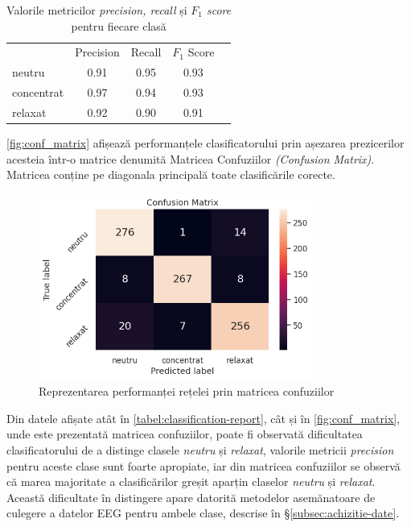 \begin{table}[ht]
\centering
\caption{Valorile metricilor \textit{precision, recall} și \textit{$F_1$ score} pentru fiecare clasă}
\label{tabel:classification-report}
\renewcommand{\arraystretch}{1.2}
\begin{tabular}{@{}lcccc@{}}
\rowcolor{gray!50}\cellcolor{white} & Precision & Recall & $F_1$ Score \\ %
neutru & 0.91 & 0.95 & 0.93 \\
concentrat & 0.97 & 0.94 & 0.93 \\
relaxat & 0.92 & 0.90 & 0.91 \\ \bottomrule
\end{tabular}
\end{table}

\autoref{fig:conf_matrix} afișează performanțele clasificatorului prin așezarea prezicerilor acesteia într-o matrice denumită Matricea Confuziilor \textit{(Confusion Matrix)}. Matricea conține pe diagonala principală toate clasificările corecte.

\begin{figure}[H]
\centering
\includegraphics[width=9cm, keepaspectratio]{fig/cap3/conf_matrix.png}
\caption{Reprezentarea performanței rețelei prin matricea confuziilor}\label{fig:conf_matrix}
\end{figure}

Din datele afișate atât în \autoref{tabel:classification-report}, cât și în \autoref{fig:conf_matrix}, unde este prezentată matricea confuziilor, poate fi observată dificultatea clasificatorului de a distinge clasele \textit{neutru} și \textit{relaxat}, valorile metricii \textit{precision} pentru aceste clase sunt foarte apropiate, iar din matricea confuziilor se observă că marea majoritate a clasificărilor greșit aparțin claselor \textit{neutru} și \textit{relaxat}. Această dificultate în distingere apare datorită metodelor asemănatoare de culegere a datelor EEG pentru ambele clase, descrise în \S\ref{subsec:achizitie-date}. 
